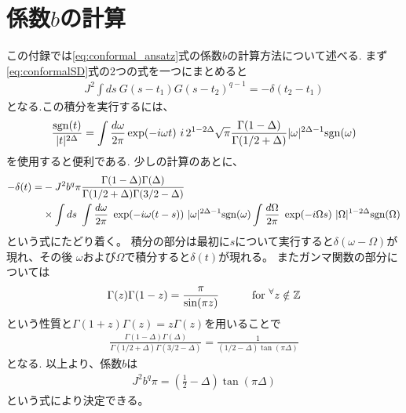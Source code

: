 \section{係数$b$の計算 \label{app:b}}
	\renewcommand{\theequation}{B.\arabic{equation}}
	\setcounter{equation}{0}
	
	この付録では\eqref{eq:conformal_ansatz}式の係数$b$の計算方法について述べる.
	まず\eqref{eq:conformalSD}式の2つの式を一つにまとめると
	\begin{align}
		J^2\int ds\ G(s - t_1)G(s - t_2)^{q - 1} = -\delta(t_2 - t_1)
		\label{eq:intOfGG}
	\end{align}
	となる.この積分を実行するには、
	\begin{align}
	\frac{\sgn(t)}{|t|^{2\Delta}} = 
		\int \frac{d\omega}{2\pi}\exp(-i\omega t)\ 
		i\, 2^{1 - 2\Delta}\sqrt{\pi}\frac{\Gamma(1 - \Delta)}{\Gamma(1/2 + \Delta)}
		|\omega|^{2\Delta - 1}\sgn(\omega)
	\end{align}
	を使用すると便利である.
	少しの計算のあとに、
	\begin{align}
	-\delta(t) = &-J^2b^q\pi
		\frac{\Gamma(1 - \Delta)\Gamma(\Delta)}{\Gamma(1/2 + \Delta)\Gamma(3/2 - \Delta)}
		\nonumber\\
		&\times \int ds\ 
		\int \frac{d\omega}{2\pi}\ \exp(-i\omega(t - s))\ |\omega|^{2\Delta - 1}\sgn(\omega)
		\int \frac{d\Omega}{2\pi}\ \exp(-i\Omega s)\ |\Omega|^{1 - 2\Delta}\sgn(\Omega)
	\end{align}
	という式にたどり着く。
	積分の部分は最初に$s$について実行すると$\delta(\omega - \Omega)$が現れ、その後
	$\omega$および$\Omega$で積分すると$\delta(t)$が現れる。
	またガンマ関数の部分については
	\begin{align}
	\Gamma(z)\Gamma(1 - z) = \frac{\pi}{\sin(\pi z)}
	\hspace{30pt}
	{\rm for}\ {}^{\forall}z \notin \mathbb{Z}
	\end{align}
	という性質と$\Gamma(1 + z)\Gamma(z) = z\Gamma(z)$を用いることで
	\begin{align}
	\frac{\Gamma(1 - \Delta)\Gamma(\Delta)}{\Gamma(1/2 + \Delta)\Gamma(3/2 - \Delta)}
	= \frac{1}{(1/2 - \Delta) \tan(\pi\Delta)}
	\end{align}
	となる. 以上より、係数$b$は
	\begin{align}
		J^2b^q\pi = \left(\frac{1}{2} - \Delta\right)\tan(\pi\Delta)
	\end{align}
	という式により決定できる。
	
	\pagebreak